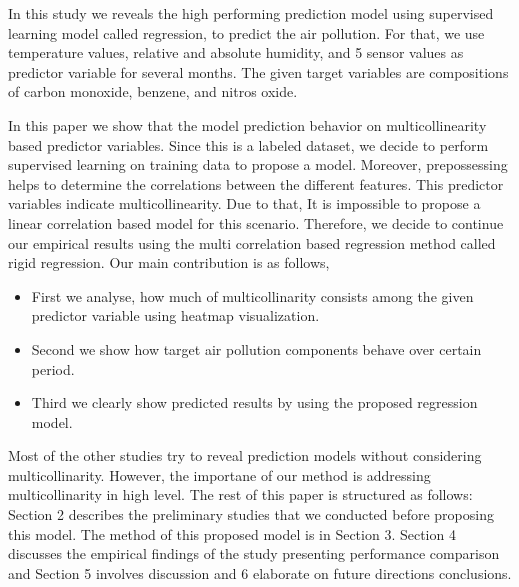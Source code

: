 {}
In this study we reveals the high performing prediction model
using supervised learning model called regression, to predict the air pollution.
For that, we use temperature values, relative and absolute humidity, 
and 5 sensor values as predictor variable for several months.
The given target variables are compositions of carbon monoxide, benzene, and nitros oxide.

{}
In this paper we show that the model prediction behavior on multicollinearity based predictor variables. 
Since this is a labeled dataset, we 
decide to perform supervised learning on training data to propose a model.
Moreover, prepossessing helps to determine the 
correlations between the different features.
This predictor variables indicate multicollinearity.
Due to that, It is impossible to propose a linear correlation based model for this scenario. 
Therefore, we decide to continue our empirical 
results using the multi correlation based regression method called rigid regression. 
Our main contribution is as follows,
\begin{itemize}
	\item First we analyse, how much of multicollinarity consists among the given predictor variable using heatmap visualization.
	\item Second we show how target air pollution components behave over certain period.
	\item Third we clearly show predicted results by using the proposed regression model.
\end{itemize}

Most of the other studies try to reveal prediction models without considering multicollinarity. 
However, the importane of our method is addressing multicollinarity in high level.
{}
The rest of this paper is structured as follows:
Section 2 describes the preliminary studies that we conducted before proposing this model.
The method of this proposed model is in Section 3.
Section 4 discusses the empirical findings of the study presenting performance comparison
and Section 5 involves discussion and 6 elaborate on future directions conclusions.


